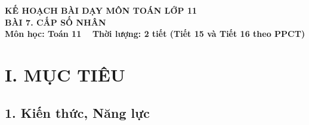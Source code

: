 \documentclass[12pt, a4paper]{article}
\begin{document}
\begin{center}
    {\fontsize{14pt}{17pt}\selectfont \textbf{KẾ HOẠCH BÀI DẠY MÔN TOÁN LỚP 11}}\\[6pt]
    {\fontsize{16pt}{19pt}\selectfont \textbf{BÀI 7. CẤP SỐ NHÂN}}\\[4pt]
    {\fontsize{12pt}{15pt}\selectfont \textbf{Môn học: Toán 11} \ \textbar \ \textbf{Thời lượng: 2 tiết (Tiết 15 và Tiết 16 theo PPCT)}}
\end{center}

\vspace{5pt}

\section*{I. MỤC TIÊU}

\subsection*{1. Kiến thức, Năng lực}
\end{document}
